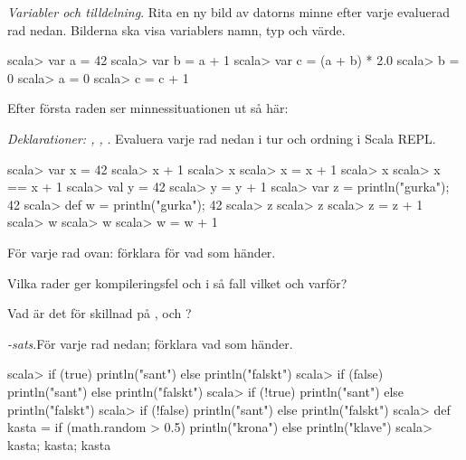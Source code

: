 {{{{\Subtask {}

\Subtask {}

\Subtask {}

\Subtask {}

\Subtask {}

\Subtask {}

\Subtask {}

\Subtask {}

\Subtask {}


\Task\Pen \textit {Variabler och tilldelning}. Rita en ny bild av datorns minne efter varje evaluerad rad nedan. Bilderna ska visa variablers namn, typ och värde. 
\begin{REPL}[numbers=left, numberstyle=\color{black}\ttfamily\scriptsize\selectfont]
scala> var a = 42
scala> var b = a + 1
scala> var c = (a + b) * 2.0
scala> b = 0
scala> a = 0
scala> c = c + 1
\end{REPL}
Efter första raden ser minnessituationen ut så här:

\vspace{0.5em}

\Task \textit{Deklarationer: , , }. Evaluera varje rad nedan i tur och ordning i Scala REPL. 
\begin{REPL}[numbers=left, numberstyle=\color{black}\ttfamily\scriptsize\selectfont]
scala> var x = 42
scala> x + 1
scala> x
scala> x = x + 1
scala> x
scala> x == x + 1
scala> val y = 42
scala> y = y + 1
scala> var z = {println("gurka"); 42}
scala> def w = {println("gurka"); 42}
scala> z
scala> z
scala> z = z + 1
scala> w
scala> w
scala> w = w + 1
\end{REPL}

\Subtask För varje rad ovan: förklara för vad som händer. 

\Subtask Vilka rader ger kompileringsfel och i så fall vilket och varför?

\Subtask\Pen Vad är det för skillnad på ,  och ?

\Task {}\textit{-sats}.För varje rad nedan; förklara vad som händer.
\begin{REPL}
scala> if (true) println("sant") else println("falskt")
scala> if (false) println("sant") else println("falskt")
scala> if (!true) println("sant") else println("falskt")
scala> if (!false) println("sant") else println("falskt")
scala> def kasta = if (math.random > 0.5) println("krona") else println("klave")
scala> kasta; kasta; kasta
\end{REPL}


}}}}
